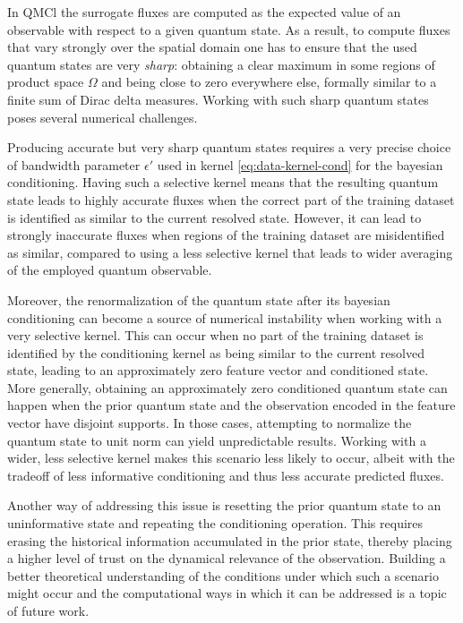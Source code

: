 \documentclass[letterpaper,10pt,3p,preprint]{elsarticle}
\begin{document}
In QMCl the surrogate fluxes are computed as the expected value
of an observable with respect to a given quantum state.
As a result, to compute fluxes that vary strongly over the
spatial domain one has to ensure that the used quantum states
are very \emph{sharp}: obtaining a clear maximum in some
regions of product space $\Omega$ and being close to zero
everywhere else, formally similar to a finite sum of Dirac
delta measures.
Working with such sharp quantum states poses several numerical
challenges.

Producing accurate but very sharp quantum states requires
a very precise choice of bandwidth parameter $\epsilon'$
used in kernel \eqref{eq:data-kernel-cond}
for the bayesian conditioning.
Having such a selective kernel means that the resulting
quantum state leads to highly accurate fluxes when the correct part of
the training dataset is identified as similar to the current resolved
state.
However, it can lead to strongly inaccurate fluxes when regions of the
training dataset are misidentified as similar, compared to using a less
selective kernel that leads to wider averaging of the employed
quantum observable.

Moreover, the renormalization of the quantum state after
its bayesian conditioning can become a source of numerical
instability when working with a very selective kernel.
This can occur when no part of the training dataset
is identified by the conditioning kernel as being similar to the
current resolved state, leading to an approximately zero
feature vector and conditioned state.
More generally, obtaining an approximately zero conditioned
quantum state can happen when the prior quantum state and
the observation encoded in the feature vector have disjoint
supports.
In those cases, attempting to normalize the quantum state to
unit norm can yield unpredictable results.
Working with a wider, less selective kernel makes this scenario less
likely to occur, albeit with the tradeoff of less informative
conditioning and thus less accurate predicted fluxes.

Another way of addressing this issue is resetting the
prior quantum state to an uninformative state and repeating
the conditioning operation.
This requires erasing the historical information accumulated
in the prior state, thereby placing a higher level of
trust on the dynamical relevance of the observation.
Building a better theoretical understanding of the conditions
under which such a scenario might occur and the computational
ways in which it can be addressed is a topic of future work.
\end{document}

